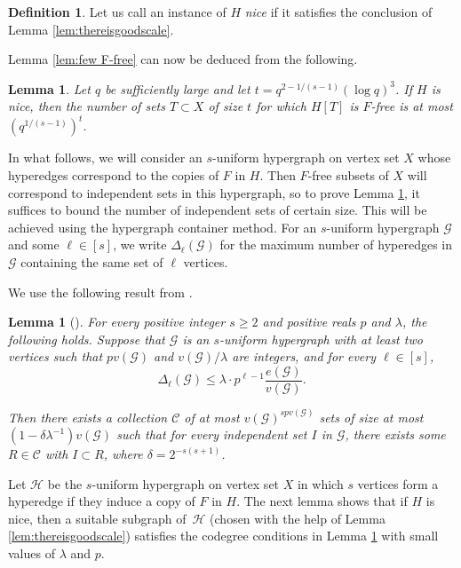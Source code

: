 \documentclass[11pt]{article}
\theoremstyle{plain}
\newtheorem{lemma}[theorem]{Lemma}
\theoremstyle{definition}
\newtheorem{definition}[theorem]{Definition}
\begin{document}
\begin{definition}
    Let us call an instance of $H$ \emph{nice} if it satisfies the conclusion of Lemma \ref{lem:thereisgoodscale}.
\end{definition}

Lemma \ref{lem:few F-free} can now be deduced from the following.

\begin{lemma} \label{lem:few F-free if nice}
    Let $q$ be sufficiently large and let $t=q^{2-1/(s-1)}(\log q)^{3}$. If $H$ is nice, then the number of sets $T\subset X$ of size $t$ for which $H[T]$ is $F$-free is at most $(q^{1/(s-1)})^t$.
\end{lemma}

In what follows, we will consider an $s$-uniform hypergraph on vertex set $X$ whose hyperedges correspond to the copies of $F$ in $H$. Then $F$-free subsets of $X$ will correspond to independent sets in this hypergraph, so to prove Lemma \ref{lem:few F-free if nice}, it suffices to bound the number of independent sets of certain size. This will be achieved using the hypergraph container method. For an $s$-uniform hypergraph $\mathcal{G}$ and some $\ell \in [s]$, we write $\Delta_{\ell}(\mathcal{G})$ for the maximum number of hyperedges in $\mathcal{G}$ containing the same set of $\ell$ vertices.

We use the following result from \cite{Janzer_Sudakov}.

\begin{lemma}[{\cite[Corollary 2.8]{Janzer_Sudakov}}] \label{lem:BMScontainer}
    For every positive integer $s\geq 2$ and positive reals $p$ and $\lambda$, the following holds. Suppose that $\mathcal{G}$ is an $s$-uniform hypergraph with at least two vertices such that $pv(\mathcal{G})$ and $v(\mathcal{G})/\lambda$ are integers, and for every $\ell\in [s]$,
    $$\Delta_{\ell}(\mathcal{G})\leq \lambda\cdot p^{\ell-1}\frac{e(\mathcal{G})}{v(\mathcal{G})}.$$

    Then there exists a collection $\mathcal{C}$ of at most $v(\mathcal{G})^{spv(\mathcal{G})}$ sets of size at most $(1-\delta \lambda^{-1})v(\mathcal{G})$ such that for every independent set $I$ in $\mathcal{G}$, there exists some $R\in \mathcal{C}$ with $I\subset R$, where $\delta=2^{-s(s+1)}$.
\end{lemma}

Let $\mathcal{H}$ be the $s$-uniform hypergraph on vertex set $X$ in which $s$ vertices form a hyperedge if they induce a copy of $F$ in $H$. The next lemma shows that if $H$ is nice, then a suitable subgraph of~$\mathcal{H}$ (chosen with the help of Lemma \ref{lem:thereisgoodscale}) satisfies the codegree conditions in Lemma \ref{lem:BMScontainer} with small values of $\lambda$ and $p$.
\end{document}
